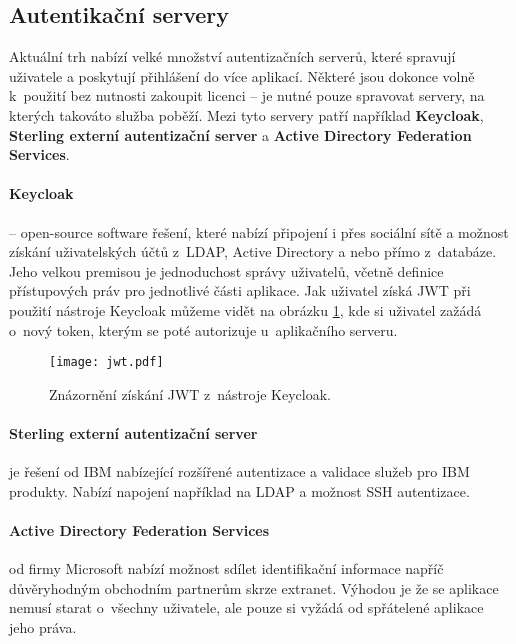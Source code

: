 \subsection{Autentikační servery} \label{auth-server}
\par Aktuální trh nabízí velké množství autentizačních serverů, které spravují uživatele a poskytují přihlášení do více aplikací. Některé jsou dokonce volně k~použití bez nutnosti zakoupit licenci -- je nutné pouze spravovat servery, na kterých takováto služba poběží. Mezi tyto servery patří například \textbf{Keycloak}, \textbf{Sterling externí autentizační server} a \textbf{Active Directory Federation Services}.

\paragraph{Keycloak} -- open-source software řešení, které nabízí připojení i přes sociální sítě a možnost získání uživatelských účtů z~LDAP, Active Directory a nebo přímo z~databáze. Jeho velkou premisou je jednoduchost správy uživatelů, včetně definice přístupových práv pro jednotlivé části aplikace. \cite{keycloak} Jak uživatel získá JWT při použití nástroje Keycloak můžeme vidět na obrázku \ref{keycloak-jwt-fig}, kde si uživatel zažádá o~nový token, kterým se poté autorizuje u~aplikačního serveru.

\begin{figure}[htp]
\centering
\texttt{[image: jwt.pdf]}
\caption{Znázornění získání JWT z~nástroje Keycloak.}
\label{keycloak-jwt-fig}
\end{figure}

\paragraph{Sterling externí autentizační server} je řešení od IBM nabízející rozšířené autentizace a validace služeb pro IBM produkty. Nabízí napojení například na LDAP a možnost SSH autentizace. \cite{ibm-ster}

\paragraph{Active Directory Federation Services} od firmy Microsoft nabízí možnost sdílet identifikační informace napříč důvěryhodným obchodním partnerům skrze extranet. Výhodou je že se aplikace nemusí starat o~všechny uživatele, ale pouze si vyžádá od spřátelené aplikace jeho práva. \cite{ADFS}

